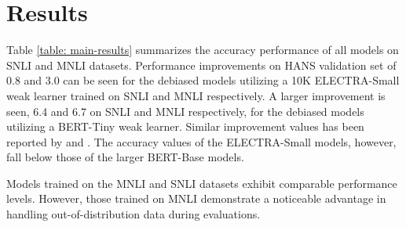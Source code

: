 \documentclass[11pt,a4paper]{article}
\begin{document}
\section{Results}
Table \ref{table: main-results} summarizes the accuracy performance of all models on SNLI and MNLI datasets. Performance improvements on HANS validation set of 0.8 and 3.0 can be seen for the debiased models utilizing a 10K ELECTRA-Small weak learner trained on SNLI and MNLI respectively. A larger improvement is seen, 6.4 and 6.7 on SNLI and MNLI respectively, for the debiased models utilizing a BERT-Tiny weak learner. Similar improvement values has been reported by \citet{utama2020debiasing} and \citet{sanh2020learning}. The accuracy values of the ELECTRA-Small models, however, fall below those of the larger BERT-Base models. 

Models trained on the MNLI and SNLI datasets exhibit comparable performance levels. However, those trained on MNLI demonstrate a noticeable advantage in handling out-of-distribution data during evaluations.
\end{document}
